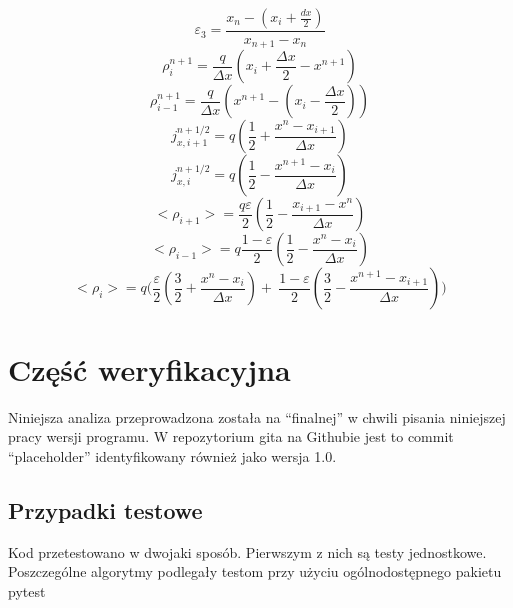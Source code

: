 \begin{equation}
    \varepsilon_3 = \frac{x_n - (x_i + \frac{dx}{2})}{x_{n+1} - x_n}
\end{equation}
\begin{equation}
    \rho_i^{n+1} = \frac{q}{\Delta x} (x_i + \frac{\Delta x}{2} - x^{n+1})
\end{equation}
\begin{equation}
    \rho_{i-1}^{n+1} = \frac{q}{\Delta x} (x^{n+1} - (x_i - \frac{\Delta x}{2}))
\end{equation}
\begin{equation}
    j_{x,i+1}^{n+1/2} = q (\frac{1}{2} + \frac{x^n - x_{i+1}}{\Delta x})
\end{equation}
\begin{equation}
    j_{x,i}^{n+1/2} = q (\frac{1}{2} - \frac{x^{n+1} - x_i}{\Delta x})
\end{equation}
\begin{equation}
    <\rho_{i+1}> = \frac{q \varepsilon}{2} (\frac{1}{2} - \frac{x_{i+1} - x^n}{\Delta x})
\end{equation}
\begin{equation}
    <\rho_{i-1}> = q \frac{1- \varepsilon}{2} (\frac{1}{2} - \frac{x^n - x_i}{\Delta x})
\end{equation}
\begin{equation}
    <\rho_{i}> = q \Bigg(\frac{\varepsilon}{2} (\frac{3}{2} + \frac{x^n-x_i}{\Delta x}) +\
    \frac{1-\varepsilon}{2} (\frac{3}{2} - \frac{x^{n+1} - x_{i+1}}{\Delta x})\Bigg)
\end{equation}

\section[Weryfikacja]{Część weryfikacyjna} %
Niniejsza analiza przeprowadzona została na ``finalnej'' w chwili pisania niniejszej pracy wersji programu.
W repozytorium gita na Githubie jest to commit ``placeholder'' %
identyfikowany również jako wersja 1.0.

\subsection{Przypadki testowe}

Kod przetestowano w dwojaki sposób. Pierwszym z nich są testy jednostkowe.
Poszczególne algorytmy podlegały testom przy użyciu ogólnodostępnego pakietu pytest %

